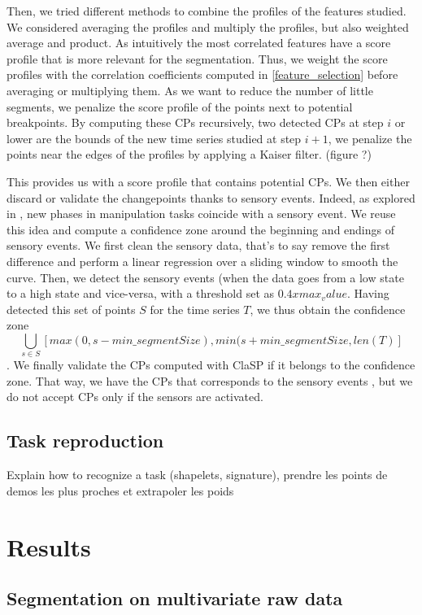 \documentclass[conference]{IEEEtran}
\begin{document}
Then, we tried different methods to combine the profiles of the features studied. We considered averaging the profiles and multiply the profiles, but also weighted average and product. As intuitively the most correlated features have a score profile that is more relevant for the segmentation. Thus, we weight the score profiles with the correlation coefficients computed in \ref{feature_selection} before averaging or multiplying them. As we want to reduce the number of little segments, we penalize the score profile of the points next to potential breakpoints. By computing these CPs recursively, two detected CPs at step $i$ or lower are the bounds of the new time series studied at step $i+1$, we penalize the points near the edges of the profiles by applying a Kaiser filter. (figure ?)

This provides us with a score profile that contains potential CPs. We then either discard or validate the changepoints thanks to sensory events. Indeed, as explored in \cite{sensory_seg}, new phases in manipulation tasks coincide  with a sensory event. We reuse this idea and compute a confidence zone around the beginning and endings of sensory events. We first clean the sensory data, that's to say remove the first difference and perform a linear regression over a sliding window to smooth the curve. Then,  we detect the sensory events  (when the data goes from a low state to a high  state and vice-versa, with a threshold set as $0.4 x max_value$. Having detected this set of points $S$ for the time series $T$, we thus obtain the confidence zone $$ \bigcup_{s \in S} [max(0, s - min\_segmentSize), min(s + min\_segmentSize, len(T)]$$. We finally validate the CPs computed with ClaSP if it belongs to the confidence zone. That way, we have the CPs that corresponds to the sensory events , but we do not accept CPs only if the sensors are activated.

\subsection{Task reproduction}

Explain how to recognize a task (shapelets, signature), prendre les points de demos les plus proches et extrapoler les poids

\section{Results} \label{results}

\subsection{Segmentation on multivariate raw data}
\end{document}
